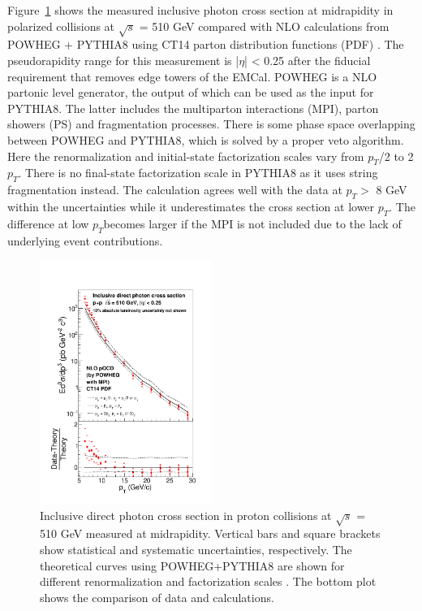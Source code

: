 \documentclass[twocolumn,letterpaper,aps,prl,longbibliography,superscriptaddress,floatfix]{revtex4-2}
\newcommand{\pT}{\ensuremath{p_T}}
\begin{document}
Figure~\ref{fig:inc} shows the measured inclusive photon cross section at midrapidity in polarized collisions at $\sqrt{s}$ = 510 GeV compared with NLO calculations from POWHEG + PYTHIA8 \cite{Nason_2004, Frixione_2007, Alioli2010, Jezo2016, Klasen2018} using CT14 parton distribution functions (PDF) \cite{PhysRevD.93.033006}. The pseudorapidity range for this measurement is |$\eta$| < 0.25 after the fiducial requirement that removes edge towers of the EMCal. POWHEG is a NLO partonic level generator, the output of which can be used as the input for PYTHIA8. The latter includes the multiparton interactions (MPI), parton showers (PS) and fragmentation processes. There is some phase space overlapping between POWHEG and PYTHIA8, which is solved by a proper veto algorithm. Here the renormalization and initial-state factorization scales vary from \pT/2 to 2\pT. There is no final-state factorization scale in PYTHIA8 as it uses string fragmentation instead. The calculation agrees well with the data at $p_T >$ 8 GeV within the uncertainties while it underestimates the cross section at lower \pT. The difference at low \pT becomes larger if the MPI is not included due to the lack of underlying event contributions.

\begin{figure}
\includegraphics[width=0.5\textwidth]{CrossSection-photon-pwhg}
\caption{Inclusive direct photon cross section in proton collisions at $\sqrt{s}$ = 510 GeV measured at midrapidity. Vertical bars and square brackets show statistical and systematic uncertainties, respectively. The theoretical curves using POWHEG+PYTHIA8 are shown for different renormalization and factorization scales \cite{Nason_2004, Frixione_2007, Alioli2010, Jezo2016}. The bottom plot shows the comparison of data and calculations.}
\label{fig:inc}
\end{figure}
\end{document}

